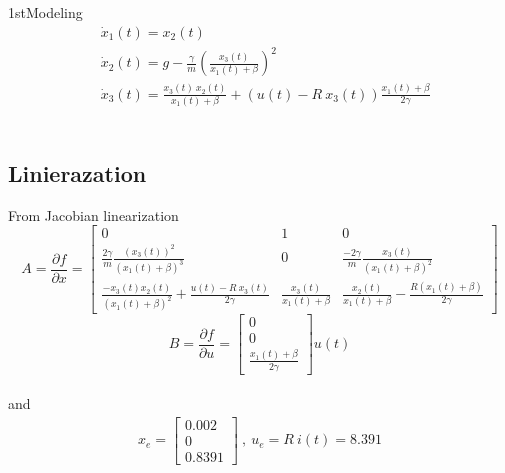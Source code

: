 \documentclass{article}
\begin{document}
\begin{homeworkProblem}{1st}{Modeling}
\begin{equation}
\begin{split}
&\dot{x}_1 (t) = x_2 (t)\\
&\dot{x}_2 (t) = g - \frac{\gamma}{m}(\frac{x_3(t)}{x_1(t)+\beta})^2\\
&\dot{x}_3 (t) = \frac{x_3(t)~x_2(t)}{x_1(t) + \beta}  + (u(t) - R~x_3(t))\frac{x_1(t) + \beta}{2\gamma}
\end{split}
\end{equation}
\\\subsection{Linierazation}
From Jacobian linearization
  \begin{equation}
    A = \frac{\partial f}{\partial x} = 
    \begin{bmatrix}
      0                                                                           & 1                            & 0\\
      \frac{2 \gamma}{m}\frac{(x_3(t))^2}{(x_1(t)+\beta)^3}                       & 0                            & \frac{- 2 \gamma}{m}\frac{x_3(t)}{(x_1(t)+\beta)^2}\\
      \frac{-x_3(t) x_2(t)}{(x_1(t) + \beta)^2} +\frac{u(t) - R~x_3(t)}{2\gamma}  & \frac{x_3(t)}{x_1(t)+\beta}  &  \frac{x_2(t)}{x_1(t) + \beta} - \frac{R(x_1(t) + \beta)}{2\gamma}
    \end{bmatrix}
  \end{equation}
  \begin{equation}
      B = \frac{\partial f}{\partial u} = \begin{bmatrix}
      0                                                     \\
      0                                                     \\
      \frac{x_1(t) + \beta}{2\gamma}
      \end{bmatrix}u(t)
  \end{equation}
\\and\\
    \begin{equation}
      \begin{gathered}
        x_e = \begin{bmatrix}
        0.002\\
        0\\
        0.8391
        \end{bmatrix}~,~ u_e = R ~ i(t) = 8.391 \\

\end{gathered}
\end{equation}
\end{homeworkProblem}
\end{document}
